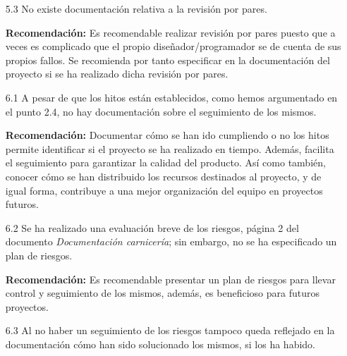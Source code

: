 \documentclass[a4paper,12pt]{report}
\begin{document}
\begin{enumerate}
    \item[5.3] No existe documentación relativa a la revisión por pares.\\
    \vspace{0.05cm}

    \textbf{Recomendación:} Es recomendable realizar revisión por pares puesto que a veces es complicado que el propio diseñador/programador se de cuenta de sus propios fallos. Se recomienda por tanto especificar en la documentación del proyecto si se ha realizado dicha revisión por pares.\\
    
    \vspace{0.05cm}
    
    \item[6.1] A pesar de que los hitos están establecidos, como hemos argumentado en el punto 2.4, no hay documentación sobre el seguimiento de los mismos.\\
    
    \vspace{0.05cm}
    
    \textbf{Recomendación:} Documentar cómo se han ido cumpliendo o no los hitos permite identificar si el proyecto se ha realizado en tiempo. Además, facilita el seguimiento para garantizar la calidad del
    producto. Así como también, conocer cómo se han distribuido los recursos destinados al proyecto, y de 
    igual forma, contribuye a una mejor organización del equipo en proyectos futuros. \\
    
    \vspace{0.05cm}
    
    \item[6.2] Se ha realizado una evaluación breve de los riesgos, página 2 del documento \textit{Documentación carnicería}; sin embargo, no se ha especificado un plan de riesgos. \\
    
    \vspace{0.05cm}
    
    \textbf{Recomendación:} Es recomendable presentar un plan de riesgos para llevar control y 
    seguimiento de los mismos, además, es beneficioso para futuros proyectos. \\
    
    \vspace{0.05cm}
    
    \item[6.3] Al no haber un seguimiento de los riesgos tampoco queda reflejado en la documentación
    cómo han sido solucionado los mismos, si los ha habido.  \\
    

\end{enumerate}
\end{document}
